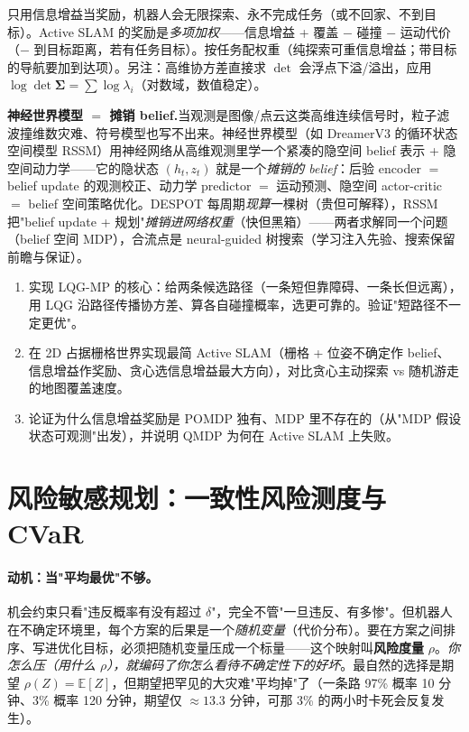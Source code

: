 \begin{pitfall}
只用信息增益当奖励，机器人会无限探索、永不完成任务（或不回家、不到目标）。Active SLAM 的奖励是\emph{多项加权}——信息增益 + 覆盖 $-$ 碰撞 $-$ 运动代价（$-$ 到目标距离，若有任务目标）。按任务配权重（纯探索可重信息增益；带目标的导航要加到达项）。另注：高维协方差直接求 $\det$ 会浮点下溢/溢出，应用 $\log\det\boldsymbol{\Sigma}=\sum\log\lambda_i$（对数域，数值稳定）。
\end{pitfall}

\begin{note}
\textbf{神经世界模型 $=$ 摊销 belief.}\;当观测是图像/点云这类高维连续信号时，粒子滤波撞维数灾难、符号模型也写不出来。神经世界模型（如 DreamerV3 的循环状态空间模型 RSSM）用神经网络从高维观测里学一个紧凑的隐空间 belief 表示 + 隐空间动力学——它的隐状态 $(h_t,z_t)$ 就是一个\emph{摊销的 belief}：后验 encoder $=$ belief update 的观测校正、动力学 predictor $=$ 运动预测、隐空间 actor-critic $=$ belief 空间策略优化。DESPOT 每周期\emph{现算}一棵树（贵但可解释），RSSM 把"belief update + 规划"\emph{摊销进网络权重}（快但黑箱）——两者求解同一个问题（belief 空间 MDP），合流点是 neural-guided 树搜索（学习注入先验、搜索保留前瞻与保证）。
\end{note}

\begin{practice}
\begin{enumerate}
  \item 实现 LQG-MP 的核心：给两条候选路径（一条短但靠障碍、一条长但远离），用 LQG 沿路径传播协方差、算各自碰撞概率，选更可靠的。验证"短路径不一定更优"。
  \item 在 2D 占据栅格世界实现最简 Active SLAM（栅格 + 位姿不确定作 belief、信息增益作奖励、贪心选信息增益最大方向），对比贪心主动探索 vs 随机游走的地图覆盖速度。
  \item 论证为什么信息增益奖励是 POMDP 独有、MDP 里不存在的（从"MDP 假设状态可观测"出发），并说明 QMDP 为何在 Active SLAM 上失败。
\end{enumerate}
\end{practice}

\section{风险敏感规划：一致性风险测度与 CVaR}
\label{sec:risk-coherent}

\paragraph{动机：当"平均最优"不够。}
机会约束只看"违反概率有没有超过 $\delta$"，完全不管"一旦违反、有多惨"。但机器人在不确定环境里，每个方案的后果是一个\emph{随机变量}（代价分布）。要在方案之间排序、写进优化目标，必须把随机变量压成一个标量——这个映射叫\textbf{风险度量} $\rho$。\emph{你怎么压（用什么 $\rho$），就编码了你怎么看待不确定性下的好坏}。最自然的选择是期望 $\rho(Z)=\mathbb{E}[Z]$，但期望把罕见的大灾难"平均掉"了（一条路 97\% 概率 10 分钟、3\% 概率 120 分钟，期望仅 $\approx13.3$ 分钟，可那 3\% 的两小时卡死会反复发生）。

